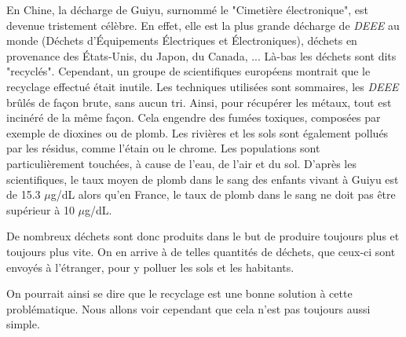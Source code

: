 \bigbreak En Chine, la décharge de Guiyu, surnommé le "Cimetière électronique", est devenue tristement célèbre. En effet, elle est la plus grande décharge de \textit{DEEE} au monde (Déchets d’Équipements Électriques et Électroniques), déchets en provenance des États-Unis, du Japon, du Canada, ... Là-bas les déchets sont dits "recyclés". Cependant, un groupe de scientifiques européens\cite{Deeechine} montrait que	le recyclage effectué était inutile. Les techniques utilisées sont sommaires, les \textit{DEEE} brûlés de façon brute, sans aucun tri. Ainsi, pour récupérer les métaux, tout est incinéré de la même façon. Cela engendre des fumées toxiques, composées par exemple de dioxines ou de plomb. Les rivières et les sols sont également pollués par les résidus, comme l'étain ou le chrome. Les populations sont particulièrement touchées, à cause de l'eau, de l'air et du sol. D'après les scientifiques, le taux moyen de plomb dans le sang des enfants vivant à Guiyu est de 15.3 $\mu$g/dL alors qu'en France, le taux de plomb dans le sang ne doit pas être supérieur à 10 $\mu$g/dL. 

\bigbreak De nombreux déchets sont donc produits dans le but de produire toujours plus et toujours plus vite. On en arrive à de telles quantités de déchets, que ceux-ci sont envoyés à l'étranger, pour y polluer les sols et les habitants. 

On pourrait ainsi se dire que le recyclage est une bonne solution à cette problématique. Nous allons voir cependant que cela n'est pas toujours aussi simple.

